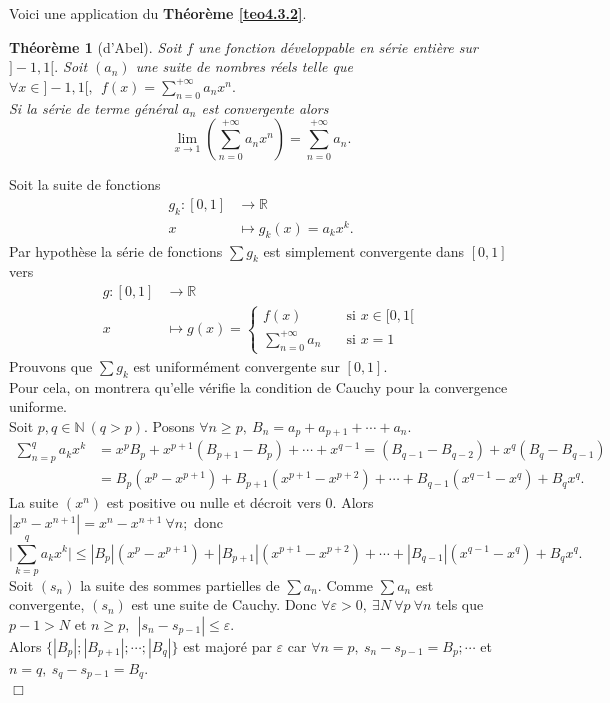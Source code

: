\documentclass[11pt, a4paper]{book}
\newtheorem{teo}{Th\'eor\`eme}[section]
\newenvironment{pr}{\noindent {\bf Preuve} \noindent} {\hfill $\Box$\vskip 5mm}
\begin{document}
Voici une application du \textbf{Th\'eor\`eme \ref{teo4.3.2}}.
\begin{teo}[d'Abel] \label{teo5.5.1}
Soit $f$ une fonction d\'eveloppable en s\'erie enti\`ere sur $]-1,1[.$ Soit $(a_n)$ une suite de nombres r\'eels telle que ${\displaystyle\forall x\in ]-1,1[,~~f(x)=\sum_{n=0}^{+\infty}a_nx^n.}$\\
Si la s\'erie de terme g\'en\'eral $a_n$ est convergente alors $$\lim_{x\rightarrow1}\left(\sum_{n=0}^{+\infty}a_nx^n\right)=\sum_{n=0}^{+\infty}a_n.$$
\end{teo}
\begin{pr}\quad
Soit la suite de fonctions \begin{align*}
g_k:[0,1]&\rightarrow\mathbb{R}\\x&\mapsto g_k(x)=a_kx^k.
\end{align*}
Par hypoth\`ese la s\'erie de fonctions $\sum g_k$ est simplement convergente dans $[0,1]$ vers \begin{align*}
g:[0,1]&\rightarrow\mathbb{R}\\ x&\mapsto g(x)=\begin{cases} f(x)&\quad\text{si $x\in [0,1[$}\\ {\displaystyle\sum_{n=0}^{+\infty}a_n}&\quad \text{si $x=1$}\end{cases}
\end{align*}
Prouvons que $\sum g_k$ est uniform\'ement convergente sur $[0,1].$\\
Pour cela, on montrera qu'elle v\'erifie la condition de Cauchy pour la convergence uniforme. \\
Soit $p,q\in \mathbb{N}~(q>p).$ Posons $\forall n\geq p,~B_n=a_p+a_{p+1}+\cdots+a_n.$
\begin{align*}
\sum_{n=p}^qa_kx^k&=x^pB_p+x^{p+1}(B_{p+1}-B_p)+\cdots+x^{q-1}=(B_{q-1}-B_{q-2})+x^q(B_q-B_{q-1})\\ &=B_p(x^p-x^{p+1})+B_{p+1}(x^{p+1}-x^{p+2})+\cdots+B_{q-1}(x^{q-1}-x^q)+B_qx^q.
\end{align*}
La suite $(x^n)$ est positive ou nulle et d\'ecroit vers $0$. Alors $|x^n-x^{n+1}|=x^n-x^{n+1}~\forall n;$ donc $$\Big|\sum_{k=p}^qa_kx^k\Big|\leq |B_p|(x^p-x^{p+1})+|B_{p+1}|(x^{p+1}-x^{p+2})+\cdots+|B_{q-1}|(x^{q-1}-x^q)+B_qx^q.$$
Soit $(s_n)$ la suite des sommes partielles de $\sum a_n.$ Comme $\sum a_n$ est convergente, $(s_n)$ est une suite de Cauchy. Donc $\forall \varepsilon>0,~\exists N ~\forall p~\forall n$ tels que $p-1>N$ et $n\geq p,~~|s_n-s_{p-1}|\leq\varepsilon.$ \\
Alors $\{|B_p|;|B_{p+1}|;\cdots;|B_q|\}$ est major\'e par $\varepsilon$ car $\forall n=p,~s_n-s_{p-1}=B_p;\cdots$ et $n=q,~s_q-s_{p-1}=B_q.$\\

\end{pr}
\end{document}
